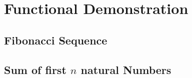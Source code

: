 \chapter{Functional Demonstration}
\section{Fibonacci Sequence}
\section{Sum of first $n$ natural Numbers}
